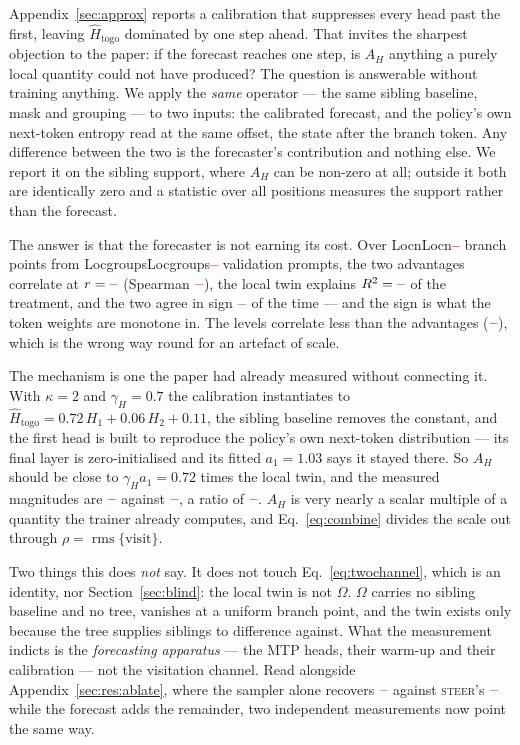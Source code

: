 \documentclass[11pt]{article}
\newcommand{\AH}{A_{H}}
\newcommand{\Om}{\Omega}
\providecommand{\PENDING}{\textcolor{red}{\textbf{--}}}
\newcommand{\num}[1]{\ifcsname #1\endcsname\csname #1\endcsname\else\PENDING\fi}
\begin{document}
Appendix~\ref{sec:approx} reports a calibration that suppresses every head past
the first, leaving $\hat{H}_{\mathrm{togo}}$ dominated by one step ahead. That
invites the sharpest objection to the paper: if the forecast reaches one step,
is $\AH$ anything a purely local quantity could not have produced? The question
is answerable without training anything. We apply the \emph{same} operator ---
the same sibling baseline, mask and grouping --- to two inputs: the calibrated
forecast, and the policy's own next-token entropy read at the same offset, the
state after the branch token. Any difference between the two is the
forecaster's contribution and nothing else. We report it on the sibling
support, where $\AH$ can be non-zero at all; outside it both are identically
zero and a statistic over all positions measures the support rather than the
forecast.

The answer is that the forecaster is not earning its cost. Over
\num{Locn} branch points from \num{Locgroups} validation prompts, the two
advantages correlate at $r = \num{Locadv}$ (Spearman $\num{Locadvrho}$), the
local twin explains $R^2 = \num{Locrsq}$ of the treatment, and the two agree in
sign $\num{Locsign}$ of the time --- and the sign is what the token weights are
monotone in. The levels correlate less than the advantages
($\num{Loclevels}$), which is the wrong way round for an artefact of scale.

The mechanism is one the paper had already measured without connecting it. With
$\kappa = 2$ and $\gamma_H = 0.7$ the calibration instantiates to
$\hat{H}_{\mathrm{togo}} = 0.72\,H_1 + 0.06\,H_2 + 0.11$, the sibling baseline
removes the constant, and the first head is built to reproduce the policy's own
next-token distribution --- its final layer is zero-initialised and its fitted
$a_1 = 1.03$ says it stayed there. So $\AH$ should be close to
$\gamma_H a_1 = 0.72$ times the local twin, and the measured magnitudes are
$\num{Locahmag}$ against $\num{Locloctwinmag}$, a ratio of $\num{Locratio}$.
$\AH$ is very nearly a scalar multiple of a quantity the trainer already
computes, and Eq.~\eqref{eq:combine} divides the scale out through
$\rho = \operatorname{rms}\{\mathrm{visit}\}$.

Two things this does \emph{not} say. It does not touch
Eq.~\eqref{eq:twochannel}, which is an identity, nor
Section~\ref{sec:blind}: the local twin is not $\Om$. $\Om$ carries no
sibling baseline and no tree, vanishes at a uniform branch point, and the twin
exists only because the tree supplies siblings to difference against. What the
measurement indicts is the \emph{forecasting apparatus} --- the MTP heads,
their warm-up and their calibration --- not the visitation channel. Read
alongside Appendix~\ref{sec:res:ablate}, where the sampler alone recovers
$\num{Rlamzeroacc}$ against \textsc{steer}'s $\num{Rsteeracc}$ while the
forecast adds the remainder, two independent measurements now point the same
way.
\end{document}
